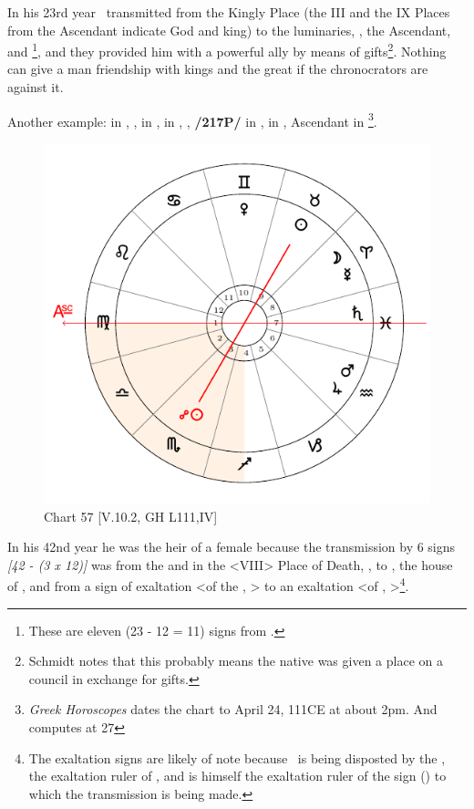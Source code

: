 In his 23rd year \Jupiter\, transmitted from the Kingly Place (the III and the IX Places from the Ascendant indicate God and king) to the luminaries, \Venus, the Ascendant, and \Mercury\footnote{These are eleven (23 - 12 = 11) signs from \Jupiter.}, and they provided him with a powerful ally by means of gifts\footnote{Schmidt notes that this probably means the native was given a place on a council in exchange for gifts.}. Nothing can give a man friendship with kings and the great if the chronocrators are against it.

Another example: \Sun\xspace in \Taurus, \Moon, \Mercury\xspace in \Aries, \Saturn\xspace in \Pisces, \Jupiter, \textbf{/217P/} \Mars\xspace in \Aquarius, \Venus\xspace in \Gemini, Ascendant in \Virgo\footnote{\textit{Greek Horoscopes} dates the chart to April 24, 111CE at about 2pm. And computes \Jupiter\xspace at 27 \Capricorn}. 

\begin{figure}
\centering
\vspace{-20pt}
\includegraphics[width=.68\textwidth]{charts/5_10_02}
\caption{Chart 57 [V.10.2, GH L111,IV]}
\label{fig:chart57}
\end{figure}

In his 42nd year he was the heir of a female because the transmission by 6 signs \textsl{[42 - (3 x 12)]} was from the \Moon\xspace and \Mercury\xspace in the <VIII> Place of Death, \Aries, to \Virgo\xspace <the Ascendant>, the house of \Mercury, and from a sign of exaltation <of the \Sun, \Aries> to an exaltation <of \Mercury, \Virgo>\footnote{The exaltation signs are likely of note because \Mercury\, is being disposted by the \Sun, the exaltation ruler of \Aries, and is himself the exaltation ruler of the sign (\Virgo) to which the transmission is being made.}. 

